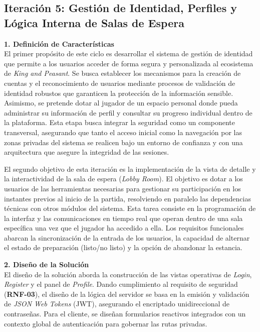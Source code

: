 \subsection{Iteración 5: Gestión de Identidad, Perfiles y Lógica Interna de Salas de Espera}

\textbf{1. Definición de Características} \\
El primer propósito de este ciclo es desarrollar el sistema de gestión de identidad que permite a los usuarios acceder de forma segura y personalizada al ecosistema de \textit{King and Peasant}. Se busca establecer los mecanismos para la creación de cuentas y el reconocimiento de usuarios mediante procesos de validación de identidad robustos que garanticen la protección de la información sensible. Asimismo, se pretende dotar al jugador de un espacio personal donde pueda administrar su información de perfil y consultar su progreso individual dentro de la plataforma. Esta etapa busca integrar la seguridad como un componente transversal, asegurando que tanto el acceso inicial como la navegación por las zonas privadas del sistema se realicen bajo un entorno de confianza y con una arquitectura que asegure la integridad de las sesiones.

El segundo objetivo de esta iteración es la implementación de la vista de detalle y la interactividad de la sala de espera (\textit{Lobby Room}). El objetivo es dotar a los usuarios de las herramientas necesarias para gestionar su participación en los instantes previos al inicio de la partida, resolviendo en paralelo las dependencias técnicas con otros módulos del sistema. Esta tarea consiste en la programación de la interfaz y las comunicaciones en tiempo real que operan dentro de una sala específica una vez que el jugador ha accedido a ella. Los requisitos funcionales abarcan la sincronización de la entrada de los usuarios, la capacidad de alternar el estado de preparación (listo/no listo) y la opción de abandonar la estancia.

\textbf{2. Diseño de la Solución} \\
El diseño de la solución aborda la construcción de las vistas operativas de \textit{Login}, \textit{Register} y el panel de \textit{Profile}. Dando cumplimiento al requisito de seguridad (\textbf{RNF-03}), el diseño de la lógica del servidor se basa en la emisión y validación de \textit{JSON Web Tokens} (JWT), asegurando el encriptado unidireccional de contraseñas. Para el cliente, se diseñan formularios reactivos integrados con un contexto global de autenticación para gobernar las rutas privadas.

